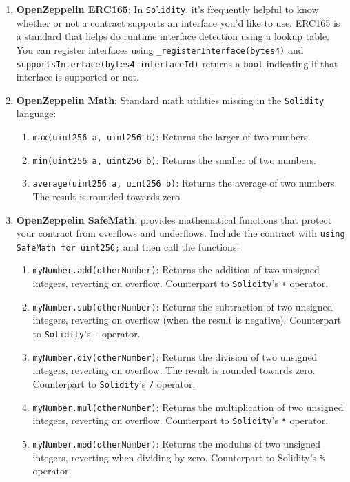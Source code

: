 \begin{enumerate}
\item\textbf{OpenZeppelin ERC165}: In \verb|Solidity|, it’s frequently helpful to know whether or not a contract supports an interface you’d like to use. ERC165 is a standard that helps do runtime interface detection using a lookup table. You can register interfaces using \verb|_registerInterface(bytes4)| and \verb|supportsInterface(bytes4 interfaceId)| returns a \verb|bool| indicating if that interface is supported or not.

\item\textbf{OpenZeppelin Math}: Standard math utilities missing in the \verb|Solidity| language:
	\begin{enumerate}
	\item\verb|max(uint256 a, uint256 b)|: Returns the larger of two numbers.
	\item\verb|min(uint256 a, uint256 b)|: Returns the smaller of two numbers.
	\item\verb|average(uint256 a, uint256 b)|: Returns the average of two numbers. The result is rounded towards zero.
	\end{enumerate}

\item\textbf{OpenZeppelin SafeMath}: provides mathematical functions that protect your contract from overflows and underflows. Include the contract with \verb|using SafeMath for uint256;| and then call the functions:
	\begin{enumerate}
	\item\verb|myNumber.add(otherNumber)|: Returns the addition of two unsigned integers, reverting on overflow. Counterpart to \verb|Solidity|'s \verb|+| operator.
	\item\verb|myNumber.sub(otherNumber)|: Returns the subtraction of two unsigned integers, reverting on overflow (when the result is negative). Counterpart to \verb|Solidity|'s \verb|-| operator.
	\item\verb|myNumber.div(otherNumber)|: Returns the division of two unsigned integers, reverting on overflow. The result is rounded towards zero. Counterpart to \verb|Solidity|'s \verb|/| operator.
	\item\verb|myNumber.mul(otherNumber)|: Returns the multiplication of two unsigned integers, reverting on overflow. Counterpart to \verb|Solidity|'s \verb|*| operator.
	\item\verb|myNumber.mod(otherNumber)|: Returns the modulus of two unsigned integers, reverting when dividing by zero. Counterpart to Solidity's \verb|%| operator.
	\end{enumerate}


\end{enumerate}
